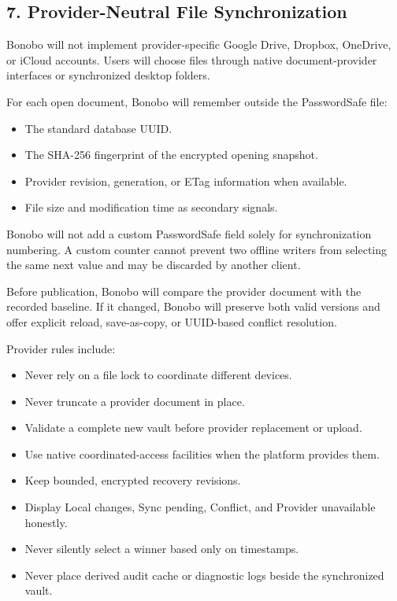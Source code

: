 \documentclass[
  letterpaper,
]{article}
\providecommand{\tightlist}{%
  \setlength{\itemsep}{0pt}\setlength{\parskip}{0pt}}
\begin{document}
\subsection{7. Provider-Neutral File Synchronization}\label{7-provider-neutral-file-synchronization}

Bonobo will not implement provider-specific Google Drive, Dropbox, OneDrive, or iCloud accounts. Users will choose files
through native document-provider interfaces or synchronized desktop folders.

For each open document, Bonobo will remember outside the PasswordSafe file:

\begin{itemize}
\tightlist
\item
  The standard database UUID.
\item
  The SHA-256 fingerprint of the encrypted opening snapshot.
\item
  Provider revision, generation, or ETag information when available.
\item
  File size and modification time as secondary signals.
\end{itemize}

Bonobo will not add a custom PasswordSafe field solely for synchronization numbering. A custom counter cannot prevent
two offline writers from selecting the same next value and may be discarded by another client.

Before publication, Bonobo will compare the provider document with the recorded baseline. If it changed, Bonobo will
preserve both valid versions and offer explicit reload, save-as-copy, or UUID-based conflict resolution.

Provider rules include:

\begin{itemize}
\tightlist
\item
  Never rely on a file lock to coordinate different devices.
\item
  Never truncate a provider document in place.
\item
  Validate a complete new vault before provider replacement or upload.
\item
  Use native coordinated-access facilities when the platform provides them.
\item
  Keep bounded, encrypted recovery revisions.
\item
  Display Local changes, Sync pending, Conflict, and Provider unavailable honestly.
\item
  Never silently select a winner based only on timestamps.
\item
  Never place derived audit cache or diagnostic logs beside the synchronized vault.
\end{itemize}
\end{document}

